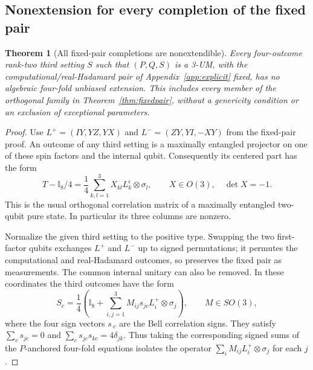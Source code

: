 \documentclass[11pt]{article}
\newtheorem{theorem}{Theorem}[section]
\newcommand{\id}{\mathbb I}
\begin{document}
\subsection{Nonextension for every completion of the fixed pair}
\begin{theorem}[All fixed-pair completions are nonextendible]
\label{thm:allfixedpair}
Every four-outcome rank-two third setting $S$ such that $(P,Q,S)$ is a
3-UM, with the computational/real-Hadamard pair of Appendix~\ref{app:explicit} fixed, has
no algebraic four-fold unbiased extension. This includes every member
of the orthogonal family in Theorem~\ref{thm:fixedpair}, without a genericity
condition or an exclusion of exceptional parameters.
\end{theorem}
\begin{proof}
Use $L^+=(IY,YZ,YX)$ and $L^-=(ZY,YI,-XY)$ from the fixed-pair proof.
An outcome of any third setting is a maximally entangled projector on
one of these spin factors and the internal qubit. Consequently its
centered part has the form
\[
 T-\id_8/4=\frac14\sum_{k,l=1}^3 X_{kl}L_k^\epsilon\otimes\sigma_l,
 \qquad X\in O(3),\quad \det X=-1.
\]
This is the usual orthogonal correlation matrix of a maximally entangled
two-qubit pure state. In particular its three columns are nonzero.

Normalize the given third setting to the positive type. Swapping the two
first-factor qubits exchanges $L^+$ and $L^-$ up to signed permutations;
it permutes the computational and real-Hadamard outcomes, so preserves
the fixed pair as measurements. The common internal unitary can also be
removed. In these coordinates the third outcomes have the form
\[
 S_c=\frac14\left(\id_8+
 \sum_{i,j=1}^3 M_{ij}s_{jc}L_i^+\otimes\sigma_j\right),
 \qquad M\in SO(3),
\]
where the four sign vectors $s_{\cdot c}$ are the Bell correlation signs.
They satisfy $\sum_c s_{jc}=0$ and
$\sum_c s_{jc}s_{kc}=4\delta_{jk}$. Thus taking the corresponding
signed sums of the $P$-anchored four-fold equations isolates the operator
$\sum_i M_{ij}L_i^+\otimes\sigma_j$ for each $j$.


\end{proof}
\end{document}
